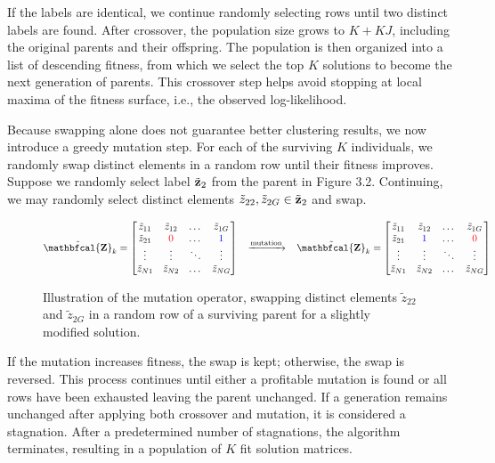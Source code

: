 \documentclass[12pt]{report}
\begin{document}
If the labels are identical, we continue randomly selecting rows until two distinct labels are found. After crossover, the population size grows to $K + KJ$, including the original parents and their offspring. The population is then organized into a list of descending fitness, from which we select the top $K$ solutions to become the next generation of parents. This crossover step helps avoid stopping at local maxima of the fitness surface, i.e., the observed log-likelihood. 

Because swapping alone does not guarantee better clustering results, we now introduce a greedy mutation step. For each of the surviving $K$ individuals, we randomly swap distinct elements in a random row until their fitness improves. Suppose we randomly select label $\tilde{\bf z}_2$ from the parent in Figure 3.2. Continuing, we may randomly select distinct elements $\tilde{z}_{22}, \tilde{z}_{2G} \in \tilde{\bf z}_2$ and swap. 
\vspace{0.5cm}
\begin{figure}[H]
$$\tilde{ {\bf \mathbfcal{Z}} }_{k}  = 
\begin{bmatrix}
    \tilde{z}_{11} & \tilde{z}_{12} & \dots & \tilde{z}_{1G} \\
    \tilde{z}_{21} & \textcolor{red}{0} & \dots & \textcolor{blue}{1} \\
    \vdots & \vdots & \ddots & \vdots \\
    \tilde{z}_{N1}& \tilde{z}_{N2}& \dots & \tilde{z}_{NG}\\
\end{bmatrix} 
\;
\;
\;
\xrightarrow{\text{mutation}}
\;
\;
\;
\tilde{ {\bf \mathbfcal{Z}} }_{k} = 
\begin{bmatrix}
    \tilde{z}_{11} & \tilde{z}_{12} & \dots & \tilde{z}_{1G} \\
    \tilde{z}_{21} & \textcolor{blue}{1} & \dots & \textcolor{red}{0} \\
    \vdots & \vdots & \ddots & \vdots \\
    \tilde{z}_{N1}& \tilde{z}_{N2}& \dots & \tilde{z}_{NG}\\
\end{bmatrix}$$
\vspace{-0.5cm}
\caption{Illustration of the mutation operator, swapping distinct elements $\tilde{z}_{22}$ and $\tilde{z}_{2G}$ in a random row of a surviving parent for a slightly modified solution.}
\end{figure}

If the mutation increases fitness, the swap is kept; otherwise, the swap is reversed. This process continues until either a profitable mutation is found or all rows have been exhausted leaving the parent unchanged. If a generation remains unchanged after applying both crossover and mutation, it is considered a stagnation. After a predetermined number of stagnations, the algorithm terminates, resulting in a population of $K$ fit solution matrices.
\end{document}
